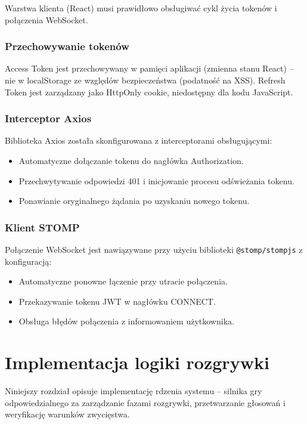 ﻿\documentclass[a4paper,twoside,11pt]{mwrep}
\theoremstyle{plain} \newtheorem{thm}{Twierdzenie}
\theoremstyle{plain} \newtheorem{lem}{Lemat}
\theoremstyle{definition} \newtheorem{defn}{Definicja}
\theoremstyle{remark} \newtheorem*{rem}{Wniosek}
\begin{document}
Warstwa klienta (React) musi prawidłowo obsługiwać cykl życia tokenów i połączenia WebSocket.

\subsection{Przechowywanie tokenów}

Access Token jest przechowywany w pamięci aplikacji (zmienna stanu React) -- nie w localStorage ze względów bezpieczeństwa (podatność na XSS). Refresh Token jest zarządzany jako HttpOnly cookie, niedostępny dla kodu JavaScript.

\subsection{Interceptor Axios}

Biblioteka Axios została skonfigurowana z interceptorami obsługującymi:
\begin{itemize}
    \item Automatyczne dołączanie tokenu do nagłówka Authorization.
    \item Przechwytywanie odpowiedzi 401 i inicjowanie procesu odświeżania tokenu.
    \item Ponawianie oryginalnego żądania po uzyskaniu nowego tokenu.
\end{itemize}

\subsection{Klient STOMP}

Połączenie WebSocket jest nawiązywane przy użyciu biblioteki \texttt{@stomp/stompjs} z konfiguracją:
\begin{itemize}
    \item Automatyczne ponowne łączenie przy utracie połączenia.
    \item Przekazywanie tokenu JWT w nagłówku CONNECT.
    \item Obsługa błędów połączenia z informowaniem użytkownika.
\end{itemize}
\chapter{Implementacja logiki rozgrywki}
\label{chap:implementacja_rozgrywki}

Niniejszy rozdział opisuje implementację rdzenia systemu -- silnika gry odpowiedzialnego za zarządzanie fazami rozgrywki, przetwarzanie głosowań i weryfikację warunków zwycięstwa.
\end{document}
